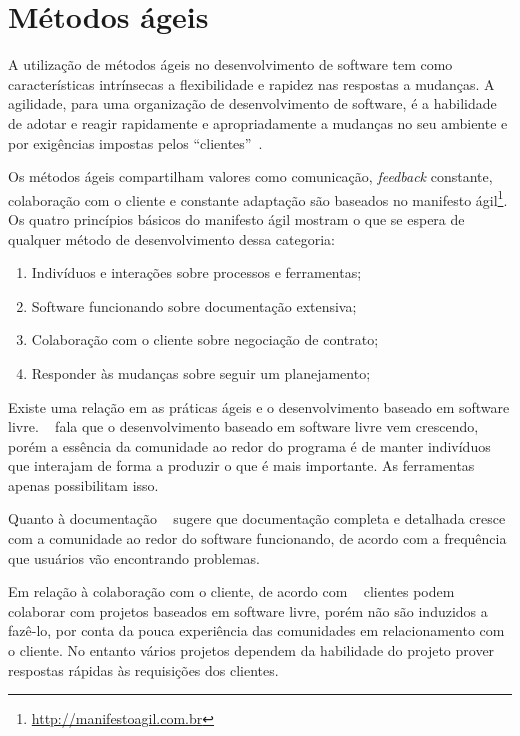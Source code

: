 
\section{Métodos ágeis}
\label{metodos-ageis}

A utilização de métodos ágeis no desenvolvimento de software tem como características 
intrínsecas a flexibilidade e rapidez nas respostas a mudanças. 
%
A agilidade, para uma organização de desenvolvimento de software, é a habilidade 
de adotar e reagir rapidamente e apropriadamente a mudanças no seu ambiente e por 
exigências impostas pelos ``clientes''~\cite{nerur2005}.
 	
Os métodos ágeis compartilham valores como comunicação, \emph{feedback} constante, colaboração com o cliente e constante adaptação são baseados no manifesto ágil\footnote{\url{http://manifestoagil.com.br}}. Os quatro princípios básicos do manifesto ágil mostram o que se espera de qualquer método de desenvolvimento dessa categoria:
%
\begin{enumerate}
\item Indivíduos  e interações sobre processos e ferramentas;
\item Software funcionando sobre documentação extensiva;
\item Colaboração com o cliente sobre negociação de contrato;
\item Responder às  mudanças sobre seguir um planejamento;
\end{enumerate}

Existe uma relação em as práticas ágeis e o desenvolvimento baseado em software livre. ~ fala que o desenvolvimento baseado em software livre vem crescendo, porém a essência da comunidade ao redor do programa é de manter indivíduos que interajam de forma a produzir o que é mais importante. As ferramentas apenas possibilitam isso. 

Quanto à documentação ~ sugere que documentação completa e detalhada cresce com a comunidade ao redor do software funcionando, de acordo com a frequência que usuários vão encontrando problemas.

Em relação à colaboração com o cliente, de acordo com ~ clientes podem colaborar com projetos baseados em software livre, porém não são induzidos a fazê-lo, por conta da pouca experiência das comunidades em relacionamento com o cliente. No entanto vários projetos dependem da habilidade do projeto prover respostas rápidas às requisições dos clientes.

